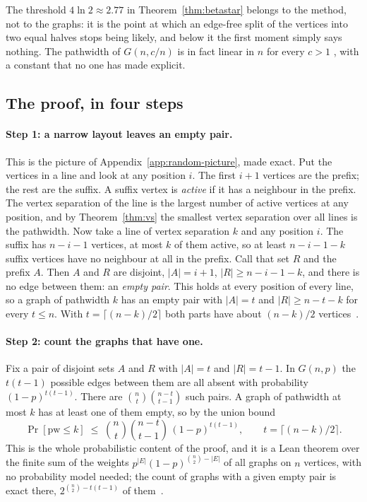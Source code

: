 The threshold $4\ln2\approx2.77$ in Theorem~\ref{thm:betastar} belongs to the
method, not to the graphs: it is the point at which an edge-free split of the
vertices into two equal halves stops being likely, and below it the first
moment simply says nothing. The pathwidth of $G(n,c/n)$ is in fact linear in
$n$ for every $c>1$ \citep{LeeLeeOum2012}, with a constant that no one has
made explicit.

\subsection{The proof, in four steps}

\paragraph{Step 1: a narrow layout leaves an empty pair.}
This is the picture of Appendix~\ref{app:random-picture}, made exact. Put the vertices in a line and look at any position $i$. The first $i+1$
vertices are the prefix; the rest are the suffix. A suffix vertex is
\emph{active} if it has a neighbour in the prefix. The vertex separation of
the line is the largest number of active vertices at any position, and by
Theorem~\ref{thm:vs} the smallest vertex separation over all lines is the
pathwidth. Now take a line of vertex separation $k$ and any position $i$. The
suffix has $n-i-1$ vertices, at most $k$ of them active, so at least $n-i-1-k$
suffix vertices have no neighbour at all in the prefix. Call that set $R$ and
the prefix $A$. Then $A$ and $R$ are disjoint, $|A|=i+1$, $|R|\ge n-i-1-k$, and
there is no edge between them: an \emph{empty pair}. This holds at every
position of every line, so a graph of pathwidth $k$ has an empty pair with
$|A|=t$ and $|R|\ge n-t-k$ for every $t\le n$. With $t=\lceil(n-k)/2\rceil$
both parts have about $(n-k)/2$ vertices~.

\paragraph{Step 2: count the graphs that have one.}
Fix a pair of disjoint sets $A$ and $R$ with $|A|=t$ and $|R|=t-1$. In
$G(n,p)$ the $t(t-1)$ possible edges between them are all absent with
probability $(1-p)^{t(t-1)}$. There are $\binom nt\binom{n-t}{t-1}$ such
pairs. A graph of pathwidth at most $k$ has at least one of them empty, so by
the union bound
\[
  \Pr[\mathrm{pw}\le k]\;\le\;\binom nt\binom{n-t}{t-1}\,(1-p)^{t(t-1)},
  \qquad t=\lceil(n-k)/2\rceil .
\]
This is the whole probabilistic content of the proof, and it is a Lean
theorem over the finite sum of the weights $p^{|E|}(1-p)^{\binom n2-|E|}$ of
all graphs on $n$ vertices, with no probability model needed; the count of
graphs with a given empty pair is exact there, $2^{\binom n2-t(t-1)}$ of
them~.

